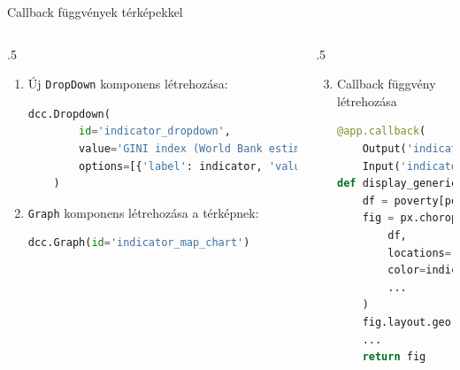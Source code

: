 \documentclass[english, aspectratio=169]{beamer}
\begin{document}
	\begin{frame}[fragile]{Callback függvények térképekkel}
		\begin{columns}
			\begin{column}{.5\textwidth}
				\begin{enumerate}
					\item Új \texttt{DropDown} komponens létrehozása:
					\begin{lstlisting}[language=python]
	dcc.Dropdown(
		id='indicator_dropdown',
		value='GINI index (World Bank estimate)',
		options=[{'label': indicator, 'value': indicator} for indicator in poverty.columns[3:54]]
	)
					\end{lstlisting}
					\item \texttt{Graph} komponens létrehozása a térképnek: 
					\begin{lstlisting}[language=python]
	dcc.Graph(id='indicator_map_chart')
					\end{lstlisting}
				\end{enumerate}
			\end{column}
			\begin{column}{.5\textwidth}
				\begin{enumerate}
					\setcounter{enumi}{2}
					\item Callback függvény létrehozása
					\begin{lstlisting}[language=python]
@app.callback(
	Output('indicator_map_chart', 'figure'),
	Input('indicator_dropdown', 'value'))
def display_generic_map_chart(indicator):
	df = poverty[poverty['is_country']]
	fig = px.choropleth(
		df,
		locations='Country Code',
		color=indicator,
		...
	)
	fig.layout.geo.showframe = False
	...
	return fig
					\end{lstlisting}
				\end{enumerate}
			\end{column}
		\end{columns}
	\end{frame}
	
\end{document}

